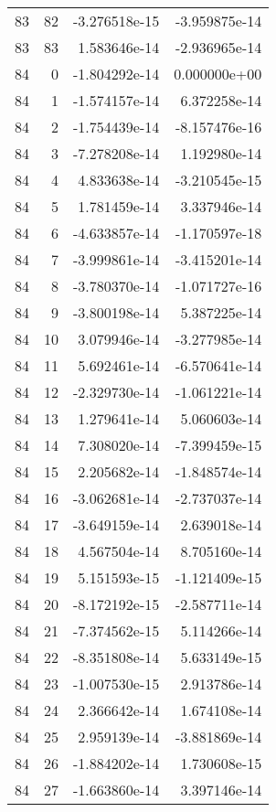 \begin{tabular}{rrrr}
  83 &   82 & -3.276518e-15 & -3.959875e-14 \\
  83 &   83 &  1.583646e-14 & -2.936965e-14 \\
  84 &    0 & -1.804292e-14 &  0.000000e+00 \\
  84 &    1 & -1.574157e-14 &  6.372258e-14 \\
  84 &    2 & -1.754439e-14 & -8.157476e-16 \\
  84 &    3 & -7.278208e-14 &  1.192980e-14 \\
  84 &    4 &  4.833638e-14 & -3.210545e-15 \\
  84 &    5 &  1.781459e-14 &  3.337946e-14 \\
  84 &    6 & -4.633857e-14 & -1.170597e-18 \\
  84 &    7 & -3.999861e-14 & -3.415201e-14 \\
  84 &    8 & -3.780370e-14 & -1.071727e-16 \\
  84 &    9 & -3.800198e-14 &  5.387225e-14 \\
  84 &   10 &  3.079946e-14 & -3.277985e-14 \\
  84 &   11 &  5.692461e-14 & -6.570641e-14 \\
  84 &   12 & -2.329730e-14 & -1.061221e-14 \\
  84 &   13 &  1.279641e-14 &  5.060603e-14 \\
  84 &   14 &  7.308020e-14 & -7.399459e-15 \\
  84 &   15 &  2.205682e-14 & -1.848574e-14 \\
  84 &   16 & -3.062681e-14 & -2.737037e-14 \\
  84 &   17 & -3.649159e-14 &  2.639018e-14 \\
  84 &   18 &  4.567504e-14 &  8.705160e-14 \\
  84 &   19 &  5.151593e-15 & -1.121409e-15 \\
  84 &   20 & -8.172192e-15 & -2.587711e-14 \\
  84 &   21 & -7.374562e-15 &  5.114266e-14 \\
  84 &   22 & -8.351808e-14 &  5.633149e-15 \\
  84 &   23 & -1.007530e-15 &  2.913786e-14 \\
  84 &   24 &  2.366642e-14 &  1.674108e-14 \\
  84 &   25 &  2.959139e-14 & -3.881869e-14 \\
  84 &   26 & -1.884202e-14 &  1.730608e-15 \\
  84 &   27 & -1.663860e-14 &  3.397146e-14 \\

\end{tabular}
